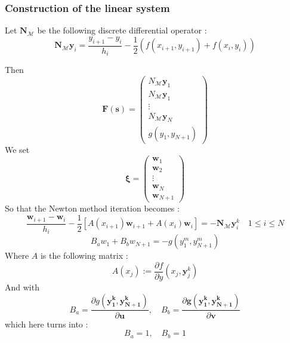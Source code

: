 \documentclass[10pt,a4paper,twocolumn]{article}
\begin{document}
\subsubsection{Construction of the linear system}

Let $\textbf{N}_{\mathcal{M}}$ be the following discrete differential operator : 
\[ \textbf{N}_{\mathcal{M}} \textbf{y}_i = \frac{y_{i+1}-y_{i}}{h_{i}}-\frac{1}{2}\left(f\left(x_{i+1}, y_{i+1}\right)+f\left(x_{i}, y_{i}\right)\right) \]

Then \[ \textbf{F}(\textbf{s}) = \begin{pmatrix}
N_{\mathcal{M}}\textbf{y}_1 \\
N_{\mathcal{M}}\textbf{y}_1 \\
\vdots \\
N_{\mathcal{M}}\textbf{y}_N \\
g(y_1, y_{N+1})
\end{pmatrix}
 \] 
We set
\[  \boldsymbol{\xi} = \begin{pmatrix}
\textbf{w}_1 \\
\textbf{w}_2 \\
\vdots \\
\textbf{w}_N \\
\textbf{w}_{N+1}
\end{pmatrix}
\]
So that the Newton method iteration becomes : 
\begin{equation}
\frac{\mathbf{w}_{i+1}-\mathbf{w}_{i}}{h_{i}}-\frac{1}{2}\left[A\left(x_{i+1}\right) \mathbf{w}_{i+1}+A\left(x_{i}\right) \mathbf{w}_{i}\right]=-\mathbf{N}_{\mathcal{M}} \mathbf{y}_{i}^{k	} \quad 1 \leq i \leq N
\end{equation}
\begin{equation}
B_{a} w_{1}+B_{b} w_{N+1}=-g\left(y_{1}^{m}, y_{N+1}^{m}\right)
\end{equation}
Where $A$ is the following matrix : 
$$
A\left(x_{j}\right):=\frac{\partial f}{\partial y}\left(x_{j},{\mathbf{y}}_{j}^{k}\right)
$$
And with $$
B_{a}=\frac{\partial g(\mathbf{y_1^k}, \mathbf{y_{N+1}^k})}{\partial \mathbf{u}}, \quad B_{b}=\frac{\partial \mathbf{g}(\mathbf{y_1^k}, \mathbf{y_{N+1}^k})}{\partial \mathbf{v}}
$$
which here turns into : 
$$
B_{a}=1, \quad B_{b}=1	
$$
\end{document}
